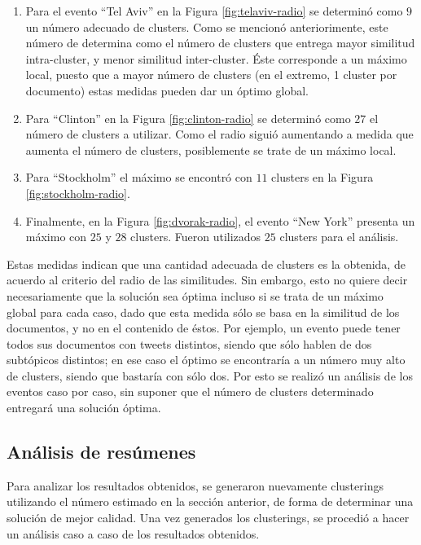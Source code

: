 \begin{enumerate}
\item Para el evento ``Tel Aviv'' en la Figura \ref{fig:telaviv-radio}
      se determinó como $9$ un número adecuado de clusters.
      Como se mencionó anteriorimente, este número de determina como el número de clusters que entrega mayor similitud intra-cluster, y menor similitud inter-cluster. Éste corresponde a un máximo local, puesto que 
      a mayor número de clusters (en el extremo, 1 cluster por documento) estas medidas pueden dar un óptimo global.
\item Para ``Clinton'' en la Figura \ref{fig:clinton-radio} se determinó como $27$ el número de clusters a utilizar. Como el radio siguió aumentando a medida que aumenta el número de clusters, posiblemente se trate de un máximo local. 

\item Para ``Stockholm'' el máximo se encontró con $11$ clusters en la Figura \ref{fig:stockholm-radio}. 

\item Finalmente, en la Figura \ref{fig:dvorak-radio}, el evento ``New York'' presenta un máximo con $25$ y $28$ clusters. Fueron utilizados $25$ clusters para el análisis.

\end{enumerate}

Estas medidas indican que una cantidad adecuada de clusters es la obtenida, de acuerdo al criterio del radio de las similitudes. Sin embargo, esto no quiere decir necesariamente que la solución sea óptima incluso si se trata de un máximo global para cada caso, dado que esta medida sólo se basa en la similitud de los documentos, y no en el contenido de éstos. Por ejemplo, un evento puede tener todos sus documentos con tweets distintos, siendo que sólo hablen de dos subtópicos distintos; en ese caso el óptimo se encontraría a un número muy alto de clusters, siendo que bastaría con sólo dos. Por esto se realizó un análisis de los eventos caso por caso, sin suponer que el número de clusters determinado entregará una solución óptima.

  

\subsection{Análisis de resúmenes}
\label{sec-4.4.3}


    Para analizar los resultados obtenidos, se generaron nuevamente
    clusterings utilizando el número estimado en la sección anterior, de
    forma de determinar una solución de mejor calidad. Una vez generados 
    los clusterings, se procedió a hacer un análisis
    caso a caso de los resultados obtenidos.


